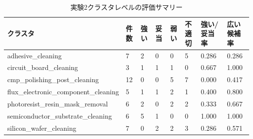 \begin{table}[tbp]
\centering
\small
\caption{実験2クラスタレベルの評価サマリー}
\label{tab:experiment2\_cluster\_summary}
\begin{tabular}{llllllll}
\toprule
クラスタ & 件数 & 強い & 妥当 & 弱い & 不適切 & 強い/妥当率 & 広い候補率 \\
\midrule
adhesive\_cleaning & 7 & 2 & 0 & 0 & 5 & 0.286 & 0.286 \\
circuit\_board\_cleaning & 3 & 1 & 1 & 1 & 0 & 0.667 & 1.000 \\
cmp\_polishing\_post\_cleaning & 12 & 0 & 0 & 5 & 7 & 0.000 & 0.417 \\
flux\_electronic\_component\_cleaning & 5 & 1 & 1 & 2 & 1 & 0.400 & 0.800 \\
photoresist\_resin\_mask\_removal & 6 & 2 & 0 & 2 & 2 & 0.333 & 0.667 \\
semiconductor\_substrate\_cleaning & 6 & 5 & 1 & 0 & 0 & 1.000 & 1.000 \\
silicon\_wafer\_cleaning & 7 & 0 & 2 & 2 & 3 & 0.286 & 0.571 \\
\bottomrule
\end{tabular}
\end{table}
